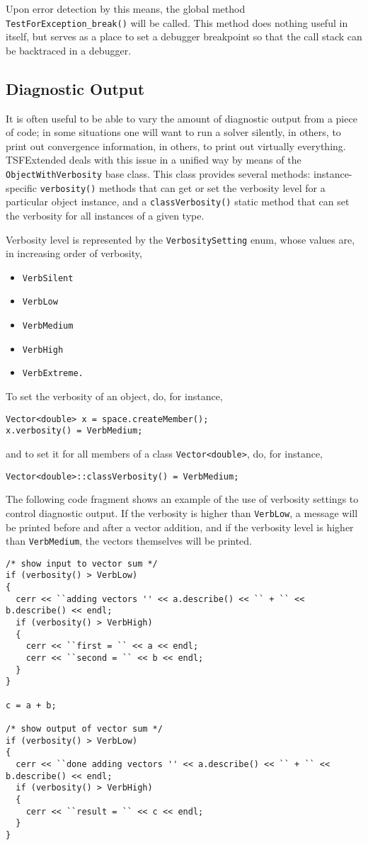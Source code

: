 Upon error detection by this means, the global method \verb+TestForException_break()+
will be called. This method does nothing useful in itself, but serves as a place
to set a debugger breakpoint so that the call stack can be backtraced in a debugger.


\subsection{Diagnostic Output}

It is often useful to be able to vary the amount of diagnostic output from a piece
of code; in some situations one will want to run a solver silently, in others,
to print out convergence information, in others, to print out virtually everything. 
TSFExtended deals with this issue in a unified way by means of the 
\verb+ObjectWithVerbosity+ base class. This class provides several methods:
instance-specific \verb+verbosity()+ methods that can get or set the 
verbosity level for a particular object instance, and a \verb+classVerbosity()+
static method that can set the verbosity for all instances of a given type.

Verbosity level is represented by the \verb+VerbositySetting+ enum, whose values
are, in increasing order of verbosity,
\begin{itemize}
\item \verb+VerbSilent+
\item \verb+VerbLow+
\item \verb+VerbMedium+
\item \verb+VerbHigh+
\item \verb+VerbExtreme.+
\end{itemize}
To set the verbosity of an object, do, for instance, 
{\scriptsize\begin{verbatim}
Vector<double> x = space.createMember();
x.verbosity() = VerbMedium;
\end{verbatim}}
and to set it for all members of a class \verb+Vector<double>+, do, for instance,
{\scriptsize\begin{verbatim}
Vector<double>::classVerbosity() = VerbMedium;
\end{verbatim}}
The following code fragment shows an example of the use of verbosity settings
to control diagnostic output. If the verbosity is higher than \verb+VerbLow+,
a message will be printed before and after a vector addition, and if 
the verbosity level is higher than \verb+VerbMedium+, the vectors themselves
will be printed.
{\scriptsize\begin{verbatim}
/* show input to vector sum */
if (verbosity() > VerbLow)
{
  cerr << ``adding vectors '' << a.describe() << `` + `` << b.describe() << endl;
  if (verbosity() > VerbHigh)
  {
    cerr << ``first = `` << a << endl;
    cerr << ``second = `` << b << endl;
  }
}

c = a + b;

/* show output of vector sum */
if (verbosity() > VerbLow)
{
  cerr << ``done adding vectors '' << a.describe() << `` + `` << b.describe() << endl;
  if (verbosity() > VerbHigh)
  {
    cerr << ``result = `` << c << endl;
  }
}
\end{verbatim}}

